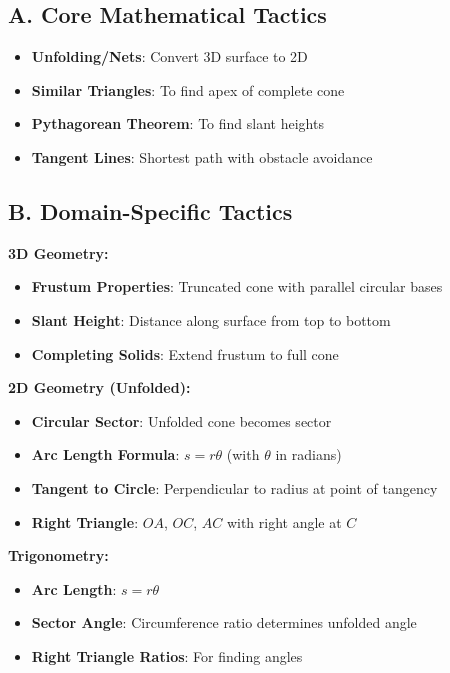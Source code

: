 \documentclass[12pt]{article}
\begin{document}
\begin{tacticalbox}
\subsection*{A. Core Mathematical Tactics}
\begin{itemize}[leftmargin=*]
    \item \textbf{Unfolding/Nets}: Convert 3D surface to 2D
    \item \textbf{Similar Triangles}: To find apex of complete cone
    \item \textbf{Pythagorean Theorem}: To find slant heights
    \item \textbf{Tangent Lines}: Shortest path with obstacle avoidance
\end{itemize}

\subsection*{B. Domain-Specific Tactics}

\textbf{3D Geometry:}
\begin{itemize}[leftmargin=*]
    \item \textbf{Frustum Properties}: Truncated cone with parallel circular bases
    \item \textbf{Slant Height}: Distance along surface from top to bottom
    \item \textbf{Completing Solids}: Extend frustum to full cone
\end{itemize}

\textbf{2D Geometry (Unfolded):}
\begin{itemize}[leftmargin=*]
    \item \textbf{Circular Sector}: Unfolded cone becomes sector
    \item \textbf{Arc Length Formula}: $s = r\theta$ (with $\theta$ in radians)
    \item \textbf{Tangent to Circle}: Perpendicular to radius at point of tangency
    \item \textbf{Right Triangle}: $OA$, $OC$, $AC$ with right angle at $C$
\end{itemize}

\textbf{Trigonometry:}
\begin{itemize}[leftmargin=*]
    \item \textbf{Arc Length}: $s = r\theta$
    \item \textbf{Sector Angle}: Circumference ratio determines unfolded angle
    \item \textbf{Right Triangle Ratios}: For finding angles
\end{itemize}


\end{tacticalbox}
\end{document}
